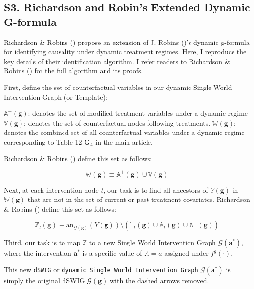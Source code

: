 \documentclass[
  single column]{article}
\begin{document}
\newpage{}

\subsection{S3. Richardson and Robin's Extended Dynamic
G-formula}\label{id-app-c}

Richardson \& Robins () propose an
extension of J. Robins ()'s dynamic
g-formula for identifying causality under dynamic treatment regimes.
Here, I reproduce the key details of their identification algorithm. I
refer readers to Richardson \& Robins
() for the full algorithm and its
proofs.

First, define the set of counterfactual variables in our dynamic Single
World Intervention Graph (or Template):

\(\mathbb{A}^+(\mathbf{g})\): denotes the set of modified treatment
variables under a dynamic regime \(\mathbb{V}(\mathbf{g})\): denotes the
set of counterfactual nodes following treatments.
\(\mathbb{W}(\mathbf{g})\): denotes the combined set of all
counterfactual variables under a dynamic regime corresponding to Table
12 \(\mathbf{G}_4\) in the main article.

Richardson \& Robins () define this
set as follows:

\[
\mathbb{W}(\mathbf{g}) \equiv \mathbb{A}^+(\mathbf{g}) \cup \mathbb{V}(\mathbf{g})
\]

Next, at each intervention node \(t\), our task is to find all ancestors
of \(Y(\mathbf{g})\) in \(\mathbb{W}(\mathbf{g})\) that are not in the
set of current or past treatment covariates. Richardson \& Robins
() define this set as follows:

\[
\mathbb{Z}_t(\mathbf{g}) \equiv \text{an}_{\mathcal{G}(\mathbf{g})}(Y(\mathbf{g})) \setminus (\mathbb{L}_t(\mathbf{g}) \cup \mathbb{A}_t(\mathbf{g}) \cup \mathbb{A}^+(\mathbf{g}))
\]

Third, our task is to map \(\mathbb{Z}\) to a new Single World
Intervention Graph \(\mathcal{G}(\mathbf{a}^*)\), where the intervention
\(\mathbf{a}^*\) is a specific value of \(A = a\) assigned under
\(f^g(\cdot)\).

This new \texttt{dSWIG} or
\texttt{dynamic\ Single\ World\ Intervention\ Graph}
\(\mathcal{G}(\mathbf{a}^*)\) is simply the original dSWIG
\(\mathcal{G}(\mathbf{g})\) with the dashed arrows removed.
\end{document}
